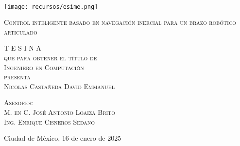 \begin{minipage}[c][0.81\textheight][t]{0.22\textwidth}
	\begin{center}
		\color{Black}\vrule width1pt height16cm 
		\vspace{5mm}
		\hskip2pt
		\color{Black}\vrule width1pt height16cm
		\hskip2mm
		\color{Black}\vrule width1pt height16cm \\
		\texttt{[image: recursos/esime.png]}
	\end{center}
\end{minipage}
\begin{minipage}[c][0.70\textheight][t]{0.7\textwidth}
	\begin{center}
		\vspace{1.5cm}
		
		{\Huge\scshape Control inteligente basado en navegaci\'on inercial para un brazo rob\'otico articulado}
		
		\vspace{3.5cm}            
		
		\textsc{\LARGE T   E   S   I   N   A}\\[0.5cm]
		\textsc{\large que para obtener el t\'itulo de}\\[0.5cm]
		\textsc{\large Ingeniero en Computaci\'on}\\[0.5cm]
		\textsc{\large presenta}\\[0.5cm]
		\textsc{\large Nicolas Castañeda David Emmanuel}\\[2cm]          
		
		\vspace{1cm}
		
	\end{center}
	
	{\large\scshape Asesores:\\[0.3cm] {M. en C. Jos\'e Antonio Loaiza Brito\\ 
			Ing. Enrique Cisneros Sedano}}
	
	\vspace{0.5cm}
	
	\begin{flushright}
		\large{Ciudad de México, 16 de enero de 2025}
	\end{flushright}
\end{minipage}

\restoregeometry

\onehalfspacing